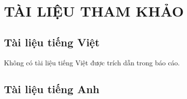 \clearpage
{}
\section*{TÀI LIỆU THAM KHẢO}
\subsection*{Tài liệu tiếng Việt}
Không có tài liệu tiếng Việt được trích dẫn trong báo cáo.
\subsection*{Tài liệu tiếng Anh}
\setlength\bibitemsep{1pt}
\setlength\bibhang{1em}
\renewcommand*{\bibfont}{\small}
\printbibliography[heading=none,notkeyword={vietnamese}]
